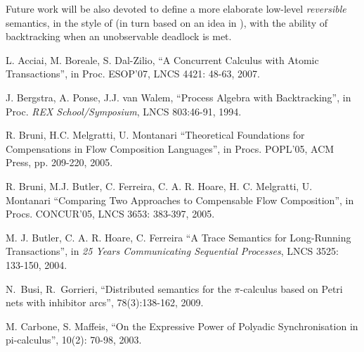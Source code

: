 \documentclass[submission,copyright,creativecommons]{eptcs}
\begin{document}
Future work will be also devoted to define a more elaborate low-level {\em reversible} semantics, in the style of  \cite{DK04} 
(in turn based on an idea in \cite{BPW94}), with the ability of backtracking when an unobservable deadlock is met.




\begin{thebibliography}{10}

L. Acciai, M. Boreale, S. Dal-Zilio,
\newblock ``A Concurrent Calculus with Atomic Transactions'', 
\newblock in Proc. ESOP'07, LNCS 4421: 48-63, 2007.

J. Bergstra, A. Ponse, J.J. van Walem,
\newblock  ``Process Algebra with Backtracking'',
\newblock in Proc. {\em REX School/Symposium}, LNCS 803:46-91, 1994.

R. Bruni, H.C. Melgratti, U. Montanari
\newblock ``Theoretical Foundations for Compensations in Flow Composition Languages'',  
\newblock in Procs. POPL'05, ACM Press, pp. 209-220, 2005.

R.  Bruni, M.J. Butler, C. Ferreira, C. A. R. Hoare, H. C. Melgratti, U. Montanari
\newblock ``Comparing Two Approaches to Compensable Flow Composition'',
\newblock in Procs. CONCUR'05, LNCS 3653: 383-397, 2005.

M. J. Butler, C. A. R. Hoare, C. Ferreira
\newblock ``A Trace Semantics for Long-Running Transactions'',
\newblock in {\em 25 Years Communicating Sequential Processes}, LNCS 3525: 133-150, 2004.


N.~Busi, R.~Gorrieri,
\newblock ``Distributed semantics for the $\pi$-calculus based on Petri nets with inhibitor arcs'',
 78(3):138-162, 2009.

M.  Carbone, S. Maffeis,
\newblock ``On the Expressive Power of Polyadic Synchronisation in pi-calculus'', 
 10(2): 70-98, 2003.


\end{thebibliography}
\end{document}
